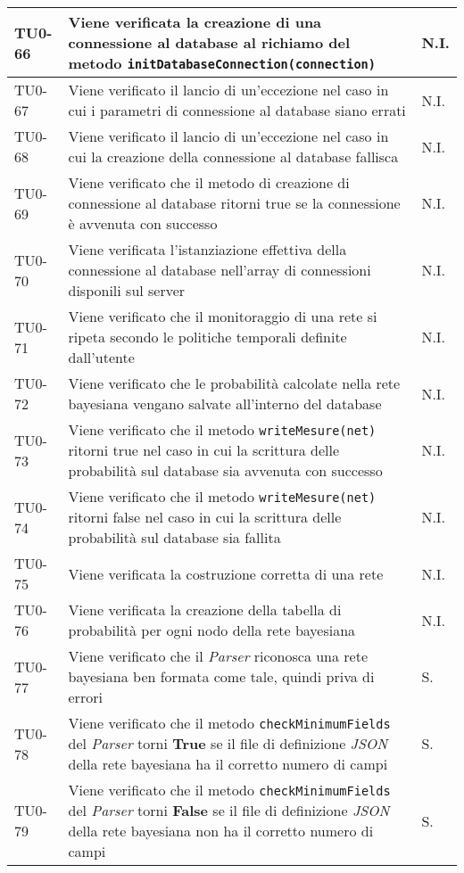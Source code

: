 \begin{longtable}{|C{.15\textwidth}|m{.66\textwidth}|C{.10\textwidth}|}
\hline
{}TU0-66 &  Viene verificata la creazione di una connessione al database al richiamo del metodo \texttt{initDatabaseConnection(connection)} & N.I.\\ 
\hline
TU0-67 & Viene verificato il lancio di un'eccezione nel caso in cui i parametri di connessione al database siano errati & N.I. \\
\hline
{} TU0-68 & Viene verificato il lancio di un'eccezione nel caso in cui la creazione della connessione al database fallisca & N.I. \\ 
\hline
TU0-69 & Viene verificato che il metodo di creazione di connessione al database ritorni true se la connessione è avvenuta con successo & N.I. \\ 
\hline 
{} TU0-70 & Viene verificata l'istanziazione effettiva della connessione al database nell'array di connessioni disponili sul server & N.I. \\ 
\hline 
TU0-71 & Viene verificato che il monitoraggio di una rete si ripeta secondo le politiche temporali definite dall'utente & N.I. \\ 
\hline 
{} TU0-72 & Viene verificato che le probabilità calcolate nella rete bayesiana vengano salvate all'interno del database  & N.I. \\ 
\hline 
TU0-73 & Viene verificato che il metodo \texttt{writeMesure(net)}  ritorni true nel caso in cui la scrittura delle probabilità sul database sia avvenuta con successo & N.I. \\
\hline
{}TU0-74 & Viene verificato che il metodo \texttt{writeMesure(net)} ritorni false nel caso in cui la scrittura delle probabilità sul database sia fallita & N.I. \\ 
\hline
TU0-75 & Viene verificata la costruzione corretta di una rete & N.I.  \\ 
\hline 
{}TU0-76 & Viene verificata la creazione della tabella di probabilità per ogni nodo della rete bayesiana & N.I. \\ 
\hline
TU0-77 & Viene verificato che il \textit{Parser} riconosca una rete bayesiana ben formata come tale, quindi priva di errori & S. \\
\hline
{}TU0-78 & Viene verificato che il metodo \texttt{checkMinimumFields} del \textit{Parser} torni \textbf{True} se il file di definizione \textit{JSON} della rete bayesiana ha il corretto numero di campi & S.\\
\hline
TU0-79 & Viene verificato che il metodo \texttt{checkMinimumFields} del \textit{Parser} torni \textbf{False} se il file di definizione \textit{JSON} della rete bayesiana non ha il corretto numero di campi & S.\\

\end{longtable}
